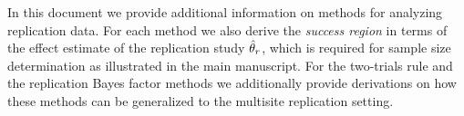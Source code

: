 \documentclass[a4paper, 11pt]{article}
\begin{document}
\maketitle

In this document we provide additional information on methods for analyzing
replication data. For each method we also derive the \emph{success region} in
terms of the effect estimate of the replication study $\hat{\theta}_{r}$, which is
required for sample size determination as illustrated in the main manuscript.
For the two-trials rule and the replication Bayes factor methods we additionally
provide derivations on how these methods can be generalized to the multisite
replication setting.

\end{document}
